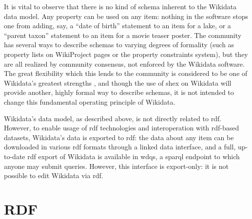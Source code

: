 It is vital to observe that there is no kind of schema inherent to the Wikidata data model.
Any property can be used on any item:
nothing in the software stops one from adding, say,
a “date of birth” statement to an item for a lake,
or a “parent taxon” statement to an item for a movie teaser poster.
The community has several ways to describe schemas to varying degrees of formality
(such as property lists on WikiProject pages or the property constraints system),
but they are all realized by community consensus,
not enforced by the Wikidata software.
The great flexibility which this lends to the community
is considered to be one of Wikidata’s greatest strengths \cite{vrandecic-restricting-the-world},
and though the use of \gls{shex}
on Wikidata will provide another,
highly formal way to describe schemas,
it is not intended to change this fundamental operating principle of Wikidata. %

Wikidata’s data model, as described above,
is not directly related to \gls{rdf}.
However, to enable usage of \gls{rdf} technologies and interoperation with \gls{rdf}-based datasets,
Wikidata’s data is exported to \gls{rdf}:
the data about any item can be downloaded in various \gls{rdf} formats through a linked data interface, %
and a full, up-to-date \gls{rdf} export of Wikidata is available in \gls{wdqs},
a \acrshort{sparql} endpoint to which anyone may submit queries.
However, this interface is export-only:
it is not possible to edit Wikidata via \gls{rdf}.


\section{RDF}
\label{sec:Background:RDF}

